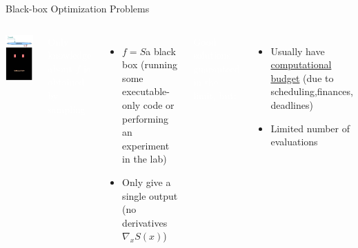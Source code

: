 \documentclass[handout,aspectratio=54]{beamer}
\numberwithin{theorem}{section}
\begin{document}
\begin{frame}{Black-box Optimization Problems}
\begin{columns}
\includegraphics[width=\textwidth]{fig/12-2.jpg}

\small{
\colorbox[rgb]{0.5,0.6,0.7}{\textcolor{white}{Only knowledge about $f$ is obtained by sampling}}
}
\begin{itemize}\small
\item $f=S$\;a black box (running some executable-only code or performing an experiment in the lab)
\item Only give a single output (no derivatives $\nabla_x S(x)$)
\end{itemize}

\small{
\colorbox[rgb]{0.5,0.6,0.7}{\textcolor{white}{Good solutions guaranteed in the limit, but:}}
}
\begin{itemize}\small
\item Usually have \underline{computational budget} (due to scheduling,finances, deadlines)
\item Limited number of evaluations
\end{itemize}
\end{columns}
\end{frame}
\end{document}
